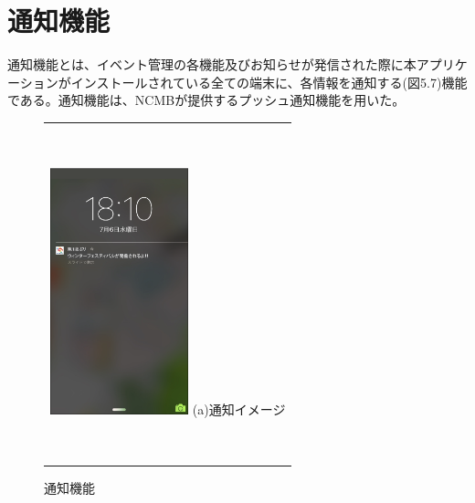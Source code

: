 \section{通知機能}%
通知機能とは、イベント管理の各機能及びお知らせが発信された際に本アプリケーションがインストールされている全ての端末に、各情報を通知する(図5.7)機能である。通知機能は、NCMBが提供するプッシュ通知機能を用いた。
​
\begin{figure}[htbp]
  \begin{center}
    \begin{tabular}{c}
​
      \begin{minipage}{0.33\hsize}
        \begin{center}
\includegraphics[width=4cm]{notification.png}
          \hspace{1cm} %
          {\footnotesize (a)通知イメージ}
        \end{center}
      \end{minipage}
​
    \end{tabular}
    \caption{通知機能}
    \label{fig:lena}
  \end{center}
\end{figure}
​
​
